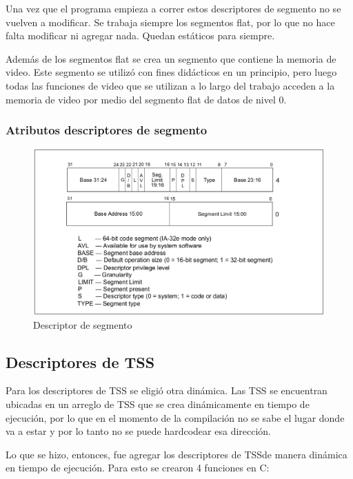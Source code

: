 	Una vez que el programa empieza a correr estos descriptores de segmento
no se vuelven a modificar. Se trabaja siempre los segmentos flat, por lo que no
hace falta modificar ni agregar nada. Quedan estáticos para siempre.

	Además de los segmentos flat se crea un segmento que contiene la memoria de video.
Este segmento se utilizó con fines didácticos en un principio, pero luego
todas las funciones de video que se utilizan a lo largo del trabajo acceden
a la memoria de video por medio del segmento flat de datos de nivel 0.

\subsubsection{Atributos descriptores de segmento}


\begin{figure}[h]
\begin{center}
  \includegraphics[scale=0.3]{secciones/dibujitos/descriptorDeSegmento.png}
\end{center}
\caption{Descriptor de segmento}
\label{fig:descriptorDeSegmento}
\end{figure}


	

\subsection{Descriptores de TSS}

	Para los descriptores de TSS se eligió otra dinámica. Las TSS se encuentran
ubicadas en un arreglo de TSS que se crea dinámicamente en tiempo de ejecución, por lo
que en el momento de la compilación no se sabe el lugar donde va a estar y por lo tanto
no se puede hardcodear esa dirección.

	Lo que se hizo, entonces, fue agregar los descriptores de TSSde manera dinámica en tiempo
de ejecución. Para esto se crearon 4 funciones en C:

